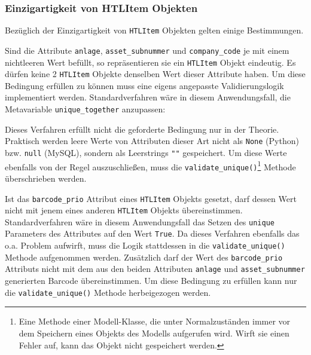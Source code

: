 \hypertarget{einzigartigkeit-von-htlitem-objekten}{%
\subsubsection{Einzigartigkeit von HTLItem
Objekten}\label{einzigartigkeit-von-htlitem-objekten}}

Bezüglich der Einzigartigkeit von \texttt{HTLItem} Objekten gelten
einige Bestimmungen.

Sind die Attribute \texttt{anlage}, \texttt{asset\_subnummer} und
\texttt{company\_code} je mit einem nichtleeren Wert befüllt, so
repräsentieren sie ein \texttt{HTLItem} Objekt eindeutig. Es dürfen
keine 2 \texttt{HTLItem} Objekte denselben Wert dieser Attribute haben.
Um diese Bedingung erfüllen zu können muss eine eigens angepasste
Validierungslogik implementiert werden. Standardverfahren wäre in diesem
Anwendungsfall, die Metavariable \texttt{unique\_together}
\cite{django-doku-models-options} anzupassen:

\begin{Shaded}
\begin{Highlighting}[]
\OperatorTok{=}\NormalTok{ [[}\NormalTok{,  }\NormalTok{, }\NormalTok{]]}
\end{Highlighting}
\end{Shaded}

Dieses Verfahren erfüllt nicht die geforderte Bedingung nur in der
Theorie. Praktisch werden leere Werte von Attributen dieser Art nicht
als \texttt{None} (Python) bzw. \texttt{null} (MySQL), sondern als
Leerstrings \texttt{""} gespeichert. Um diese Werte ebenfalls von der
Regel auszuschließen, muss die \texttt{validate\_unique()}\footnote{Eine
  Methode einer Modell-Klasse, die unter Normalzuständen immer vor dem
  Speichern eines Objekts des Modells aufgerufen wird. Wirft sie einen
  Fehler auf, kann das Objekt nicht gespeichert werden.} Methode
\cite{django-doku-models-instances} überschrieben werden.

Ist das \texttt{barcode\_prio} Attribut eines \texttt{HTLItem} Objekts
gesetzt, darf dessen Wert nicht mit jenem eines anderen \texttt{HTLItem}
Objekts übereinstimmen. Standardverfahren wäre in diesem Anwendungsfall
das Setzen des \texttt{unique} Parameters des Attributes auf den Wert
\texttt{True}. Da dieses Verfahren ebenfalls das o.a. Problem aufwirft,
muss die Logik stattdessen in die \texttt{validate\_unique()} Methode
aufgenommen werden. Zusätzlich darf der Wert des \texttt{barcode\_prio}
Attributs nicht mit dem aus den beiden Attributen \texttt{anlage} und
\texttt{asset\_subnummer} generierten Barcode übereinstimmen. Um diese
Bedingung zu erfüllen kann nur die \texttt{validate\_unique()} Methode
herbeigezogen werden.

